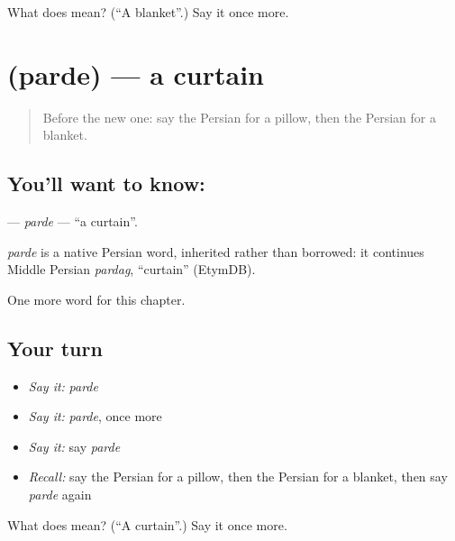 \begin{tcolorbox}[breakable,colback=teal!4,colframe=teal!35!black,title={Before you move on}]
What does  mean? (\textquotedblleft{}A blanket\textquotedblright{}.) Say it once more.
\end{tcolorbox}
\section[\texorpdfstring{\fa{پرده} (parde)}{پرده (parde)}]{ (parde) — a curtain}

\label{lesson:FA-C93-parde}



\begin{quote}
Before the new one: say the Persian for a pillow, then the Persian for a blanket.
\end{quote}

\subsection*{You'll want to know: }
\textbf{} — \emph{parde} — \textquotedblleft{}a curtain\textquotedblright{}.

\begin{cousinweb}
\emph{parde} is a native Persian word, inherited rather than borrowed: it continues Middle Persian \emph{pardag}, \textquotedblleft{}curtain\textquotedblright{} (EtymDB).
\end{cousinweb}

\begin{grammarlens}[title={What you've built}]
One more word for this chapter.
\end{grammarlens}

\subsection*{Your turn}
\begin{itemize}
\raggedright
  \item \emph{Say it:} \emph{parde}
  \item \emph{Say it:} \emph{parde}, once more
  \item \emph{Say it:} say \emph{parde}
  \item \emph{Recall:} say the Persian for a pillow, then the Persian for a blanket, then say \emph{parde} again
\end{itemize}

\begin{tcolorbox}[breakable,colback=teal!4,colframe=teal!35!black,title={Before you move on}]
What does  mean? (\textquotedblleft{}A curtain\textquotedblright{}.) Say it once more.
\end{tcolorbox}
